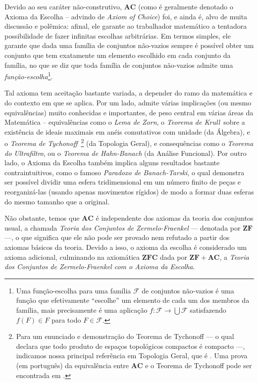 \documentclass{hipatia}
\newcommand{\ac}{\mathbf{AC}}
\newcommand{\zf}{\mathbf{ZF}}
\newcommand{\zfc}{\mathbf{ZFC}}
\begin{document}
Devido ao seu caráter não-construtivo, $\ac$ (como é
geralmente denotado o Axioma da Escolha -- advindo de {\it
Axiom of Choice}) foi, e ainda é, alvo de muita discussão e
polêmica:  afinal, ele garante ao trabalhador matemático a
tentadora possibilidade de fazer infinitas escolhas
arbitrárias. Em termos simples, ele garante que dada uma
família de conjuntos não-vazios sempre é possível obter um
conjunto que tem exatamente um elemento escolhido em cada
conjunto da família, no que se diz que toda família de
conjuntos não-vazios admite uma {\it
função-escolha}\footnote{Uma função-escolha para uma família
$\mathcal{F}$ de conjuntos não-vazios é uma função que
efetivamente ``escolhe'' um elemento de cada um dos membros
da família, mais precisamente é uma aplicação $f\colon \mathcal{F} \to
\bigcup \mathcal{F}$ satisfazendo  %
$f(F) \in F$ %
para todo $F \in \mathcal{F}$.}.

Tal axioma tem aceitação bastante variada, a depender do ramo da matemática e do contexto em que se aplica. Por um lado, admite várias implicações (ou mesmo equivalências) muito conhecidas e importantes, de peso central em várias áreas da Matemática -- equivalências como o {\it Lema de Zorn}, o {\it Teorema de Krull}\, sobre a existência de ideais maximais em anéis comutativos com unidade (da Álgebra), e o {\it Teorema de Tychonoff}\,\,\,\footnote{Para um enunciado e demonstração do Teorema de Tychonoff --- o qual declara que todo produto de espaços topológicos compactos é compacto ---, indicamos nossa principal referência em Topologia Geral, que é \cite{Engel}. Uma prova (em português) da equivalência entre $\ac$ e o Teorema de Tychonoff pode ser encontrada em \cite{deJesusdaSilva}.} (da Topologia Geral), e consequências como o {\it Teorema do Ultrafiltro}, ou o {\it Teorema de Hahn-Banach} (da Análise Funcional). Por outro lado, o Axioma da Escolha também implica alguns resultados bastante contraintuitivos, como o famoso {\it Paradoxo de Banach-Tarski}, o qual demonstra ser possível dividir uma esfera tridimensional em um número finito de peças e reorganizá-las (usando apenas movimentos rígidos) de modo a formar duas esferas do mesmo tamanho que a original.

Não obstante, temos que $\ac$ é independente dos axiomas
da teoria dos conjuntos usual, a chamada {\it Teoria
dos Conjuntos de Zermelo-Fraenkel} --- denotada por $\zf$ ---, o
que significa que ele não pode ser provado nem refutado a
partir dos axiomas básicos da teoria. Devido a isso, o
axioma da escolha é considerado um axioma adicional,
culminando na axiomática $\zfc$ dada por $\zf+\ac$, a {\it
Teoria dos Conjuntos de Zermelo-Fraenkel com o Axioma da
Escolha}.
\end{document}

